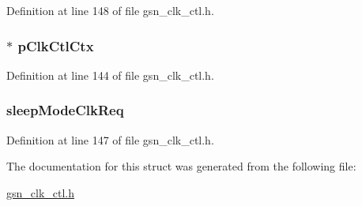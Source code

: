 Definition at line 148 of file gsn\_\-clk\_\-ctl.h.

\hypertarget{a00038_a21ed23d1aa476d25064b55498df83a53}{
\subsubsection[{pClkCtlCtx}]{$\ast$ {\bf pClkCtlCtx}}}
\label{a00038_a21ed23d1aa476d25064b55498df83a53}


Definition at line 144 of file gsn\_\-clk\_\-ctl.h.

\hypertarget{a00038_a18fe4fb169866906d107cfda95ea91c4}{
\subsubsection[{sleepModeClkReq}]{ {\bf sleepModeClkReq}}}
\label{a00038_a18fe4fb169866906d107cfda95ea91c4}


Definition at line 147 of file gsn\_\-clk\_\-ctl.h.



The documentation for this struct was generated from the following file:\begin{DoxyCompactItemize}
\item 
\hyperlink{a00477}{gsn\_\-clk\_\-ctl.h}\end{DoxyCompactItemize}
